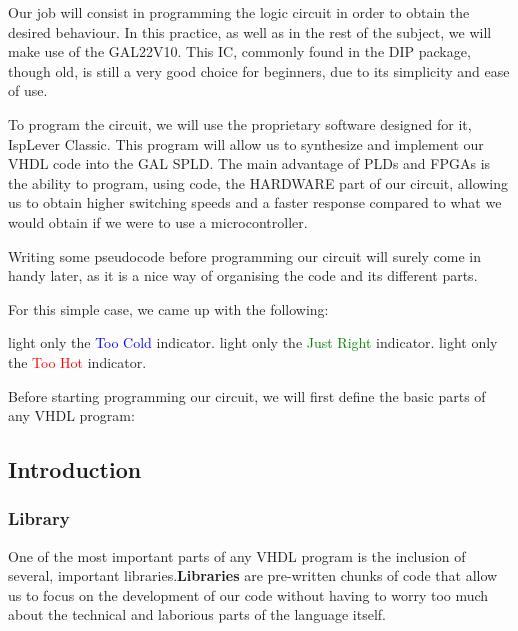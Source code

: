 Our job will consist in programming the logic circuit in order to obtain the desired behaviour. In this practice, as well as in the rest of the subject, we will make use of the GAL22V10. This IC, commonly found in the DIP package, though old, is still a very good choice for beginners, due to its simplicity and ease of use.\medskip

\newpage

To program the circuit, we will use the proprietary software designed for it, IspLever Classic. This program will allow us to synthesize and implement our VHDL code into the GAL SPLD. The main advantage of PLDs and FPGAs is the ability to program, using code, the HARDWARE part of our circuit, allowing us to obtain higher switching speeds and a faster response compared to what we would obtain if we were to use a microcontroller.\medskip

Writing some pseudocode before programming our circuit will surely come in handy later, as it is a nice way of organising the code and its different parts.

For this simple case, we came up with the following:\medskip

\begin{algorithm}
        \begin{algorithmic}
            \STATE light only the \textcolor{blue}{Too Cold} indicator.
            \STATE light only the \textcolor{green}{Just Right} indicator.
            \ELSE{}
            \STATE light only the \textcolor{red}{Too Hot} indicator.
            \ENDIF
        \end{algorithmic}
\end{algorithm}

Before starting programming our circuit, we will first define the basic parts of any VHDL program:

\subsection{Introduction}

\subsubsection{Library}

One of the most important parts of any VHDL program is the inclusion of several, important libraries.\textbf{Libraries} are pre-written chunks of code that allow us to focus on the development of our code without having to worry too much about the technical and laborious parts of the language itself.

